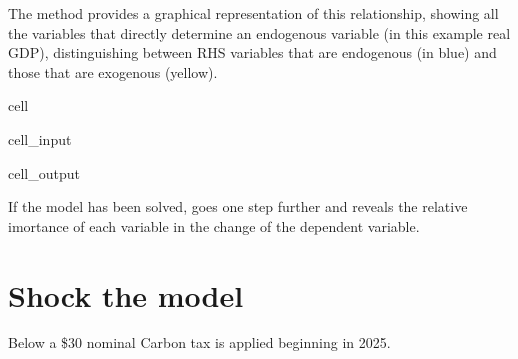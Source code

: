 \documentclass[letterpaper,10pt,english]{jupyterBook}
\begin{document}
\sphinxAtStartPar
The method  provides a graphical representation of this relationship, showing all the variables that directly determine an endogenous variable (in this example real GDP), distinguishing between RHS variables that are endogenous (in blue) and those that are exogenous (yellow).

\begin{sphinxuseclass}{cell}\begin{sphinxVerbatimInput}

\begin{sphinxuseclass}{cell_input}
\begin{sphinxVerbatim}[commandchars=\\\{\}]
\end{sphinxVerbatim}

\end{sphinxuseclass}\end{sphinxVerbatimInput}
\begin{sphinxVerbatimOutput}

\begin{sphinxuseclass}{cell_output}
\noindent{}

\end{sphinxuseclass}\end{sphinxVerbatimOutput}

\end{sphinxuseclass}
\sphinxAtStartPar
If the model has been solved,  goes one step further and reveals the relative imortance of each variable in the change of the dependent variable.


\section{Shock the model}
\label{\detokenize{content/06_ModelAnalytics/ModelStructure:shock-the-model}}
\sphinxAtStartPar
Below a \$30 nominal Carbon tax is applied beginning in 2025.
\end{document}
